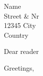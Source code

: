 \documentclass[a4paper,11pt]{scrlttr2}
\def\toName{Name}
\def\toAddr{Street \& Nr}
\def\toPostcode{12345}
\def\toCity{City}
\def\toCountry{Country}
\begin{document}
    \begin{letter}{\toName\\\toAddr\\{\toPostcode} \toCity\\\toCountry}
        \opening{Dear reader}
        \blindtext{}

        \closing{Greetings,}
    \end{letter}
    
\end{document}
